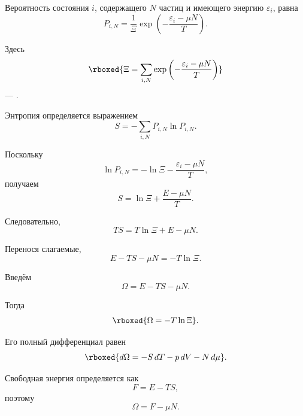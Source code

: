 \documentclass[../final.tex]{subfiles}
\begin{document}
Вероятность состояния $i$, содержащего $N$ частиц и имеющего энергию
$\varepsilon_i$, равна
%
\begin{equation*}
    P_{i,N}
    =
    \frac{1}{\Xi}
    \exp
    \left(
        -\frac{\varepsilon_i-\mu N}{T}
    \right).
\end{equation*}

Здесь
%
\[
    \rboxed{
        \Xi
        =
        \sum_{i,N}
        \exp
        \left(
            -\frac{\varepsilon_i-\mu N}{T}
        \right)
    }
\]
%
--- .

Энтропия определяется выражением
%
\begin{equation*}
    S
    =
    -\sum_{i,N}
    P_{i,N}\ln P_{i,N}.
\end{equation*}

Поскольку
%
\begin{equation*}
    \ln P_{i,N}
    =
    -\ln\Xi
    -
    \frac{\varepsilon_i-\mu N}{T},
\end{equation*}
%
получаем
%
\begin{equation*}
    S
    =
    \ln\Xi
    +
    \frac{E-\mu N}{T}.
\end{equation*}

Следовательно,
%
\begin{equation*}
    TS
    =
    T\ln\Xi
    +
    E
    -
    \mu N.
\end{equation*}

Перенося слагаемые,
%
\begin{equation*}
    E
    -
    TS
    -
    \mu N
    =
    -T\ln\Xi.
\end{equation*}

Введём 
%
\begin{equation*}
    \Omega
    =
    E
    -
    TS
    -
    \mu N.
\end{equation*}

Тогда
%
\[
    \rboxed{
        \Omega
        =
        -T\ln\Xi
    }.
\]

Его полный дифференциал равен
%
\[
    \rboxed{
        d\Omega
        =
        -S\,dT
        -
        p\,dV
        -
        N\,d\mu
    }.
\]

Свободная энергия определяется как
%
\begin{equation*}
    F
    =
    E-TS,
\end{equation*}
%
поэтому
%
\begin{equation*}
    \Omega
    =
    F-\mu N.
\end{equation*}
\end{document}
